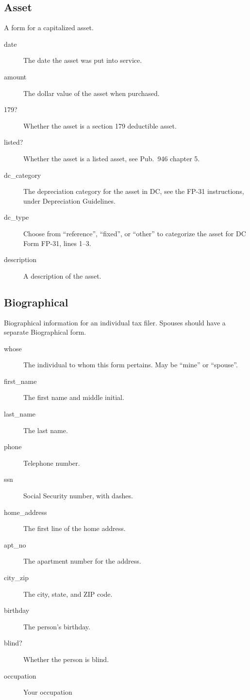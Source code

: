 \documentclass[12pt]{article}
\begin{document}
\subsection{Asset}

A form for a capitalized asset.

\begin{description}
\item[date] The date the asset was put into service.
\item[amount] The dollar value of the asset when purchased.
\item[179?] Whether the asset is a section 179 deductible asset.
\item[listed?] Whether the asset is a listed asset, see Pub.~946 chapter 5.
\item[dc\_category] The depreciation category for the asset in DC, see the FP-31
instructions, under Depreciation Guidelines.
\item[dc\_type] Choose from ``reference'', ``fixed'', or ``other'' to categorize
the asset for DC Form FP-31, lines 1--3.
\item[description] A description of the asset.
\end{description}


\subsection{Biographical}

Biographical information for an individual tax filer. Spouses should have a
separate Biographical form.

\begin{description}
\item[whose] The individual to whom this form pertains. May be ``mine'' or
``spouse''.
\item[first\_name] The first name and middle initial.
\item[last\_name] The last name.
\item[phone] Telephone number.
\item[ssn] Social Security number, with dashes.
\item[home\_address] The first line of the home address.
\item[apt\_no] The apartment number for the address.
\item[city\_zip] The city, state, and ZIP code.
\item[birthday] The person's birthday.
\item[blind?] Whether the person is blind.
\item[occupation] Your occupation
\end{description}
\end{document}
